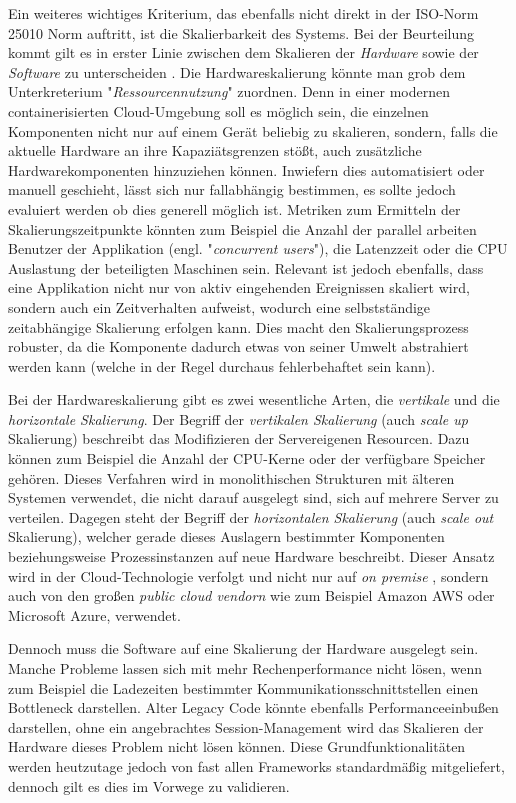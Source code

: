 Ein weiteres wichtiges Kriterium, das ebenfalls nicht direkt in der ISO-Norm 25010 Norm auftritt, ist die Skalierbarkeit des Systems. Bei der Beurteilung kommt gilt es in erster Linie zwischen dem Skalieren der \emph{Hardware} sowie der \emph{Software} zu unterscheiden \cite{nfr-dotnetcurry}. Die Hardwareskalierung könnte man grob dem Unterkreterium "\emph{Ressourcennutzung}" zuordnen. Denn in einer modernen containerisierten Cloud-Umgebung soll es möglich sein, die einzelnen Komponenten nicht nur auf einem Gerät beliebig zu skalieren, sondern, falls die aktuelle Hardware an ihre Kapaziätsgrenzen stößt, auch zusätzliche Hardwarekomponenten hinzuziehen können. Inwiefern dies automatisiert oder manuell geschieht, lässt sich nur fallabhängig bestimmen, es sollte jedoch evaluiert werden ob dies generell möglich ist. Metriken zum Ermitteln der Skalierungszeitpunkte könnten zum Beispiel die Anzahl der parallel arbeiten Benutzer der Applikation (engl. "\emph{concurrent users}"), die Latenzzeit oder die CPU Auslastung der beteiligten Maschinen sein. Relevant ist jedoch ebenfalls, dass eine Applikation nicht nur von aktiv eingehenden Ereignissen skaliert wird, sondern auch ein Zeitverhalten aufweist, wodurch eine selbstständige zeitabhängige Skalierung erfolgen kann. Dies macht den Skalierungsprozess robuster, da die Komponente dadurch etwas von seiner Umwelt abstrahiert werden kann (welche in der Regel durchaus fehlerbehaftet sein kann). 

Bei der Hardwareskalierung gibt es zwei wesentliche Arten, die \emph{vertikale} und die \emph{horizontale Skalierung}. Der Begriff der \emph{vertikalen Skalierung} (auch \emph{scale up} Skalierung) beschreibt das Modifizieren der Servereigenen Resourcen. Dazu können zum Beispiel die Anzahl der CPU-Kerne oder der verfügbare Speicher gehören. Dieses Verfahren wird in monolithischen Strukturen mit älteren Systemen verwendet, die nicht darauf ausgelegt sind, sich auf mehrere Server zu verteilen. Dagegen steht der Begriff der \emph{horizontalen Skalierung} (auch \emph{scale out} Skalierung), welcher gerade dieses Auslagern bestimmter Komponenten beziehungsweise Prozessinstanzen auf neue Hardware beschreibt. Dieser Ansatz wird in der Cloud-Technologie verfolgt und nicht nur auf \emph{on premise} , sondern auch von den großen \emph{public cloud vendorn}  wie zum Beispiel Amazon AWS oder Microsoft Azure, verwendet.

Dennoch muss die Software auf eine Skalierung der Hardware ausgelegt sein. Manche Probleme lassen sich mit mehr Rechenperformance nicht lösen, wenn zum Beispiel die Ladezeiten bestimmter Kommunikationsschnittstellen einen Bottleneck darstellen. Alter Legacy Code könnte ebenfalls Performanceeinbußen darstellen, ohne ein angebrachtes Session-Management wird das Skalieren der Hardware dieses Problem nicht lösen können. Diese Grundfunktionalitäten werden heutzutage jedoch von fast allen Frameworks standardmäßig mitgeliefert, dennoch gilt es dies im Vorwege zu validieren. 


